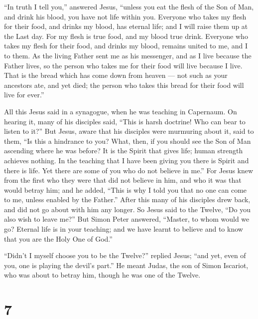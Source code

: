  ``In truth I tell you,'' answered Jesus, ``unless you eat
the flesh of the Son of Man, and drink his blood, you have not life
within you.  Everyone who takes my flesh for their food,
and drinks my blood, has eternal life; and I will raise them up at the
Last day.  For my flesh is true food, and my blood true
drink.  Everyone who takes my flesh for their food, and
drinks my blood, remains united to me, and I to them.  As
the living Father sent me as his messenger, and as I live because the
Father lives, so the person who takes me for their food will live
because I live.  That is the bread which has come down from
heaven --- not such as your ancestors ate, and yet died; the person who
takes this bread for their food will live for ever.''

 All this Jesus said in a synagogue, when he was teaching
in Capernaum.  On hearing it, many of his disciples said,
``This is harsh doctrine! Who can bear to listen to it?'' 
But Jesus, aware that his disciples were murmuring about it, said to
them,  ``Is this a hindrance to you? What, then, if you
should see the Son of Man ascending where he was before? 
It is the Spirit that gives life; human strength achieves nothing. In
the teaching that I have been giving you there is Spirit and there is
life.  Yet there are some of you who do not believe in
me.'' For Jesus knew from the first who they were that did not believe
in him, and who it was that would betray him;  and he
added, ``This is why I told you that no one can come to me, unless
enabled by the Father.''  After this many of his disciples
drew back, and did not go about with him any longer.  So
Jesus said to the Twelve, ``Do you also wish to leave me?''
 But Simon Peter answered, ``Master, to whom would we go?
Eternal life is in your teaching;  and we have learnt to
believe and to know that you are the Holy One of God.''

 ``Didn't I myself choose you to be the Twelve?'' replied
Jesus; ``and yet, even of you, one is playing the devil's part.''
 He meant Judas, the son of Simon Iscariot, who was about
to betray him, though he was one of the Twelve.

\hypertarget{section-6}{%
\section{7}\label{section-6}}

